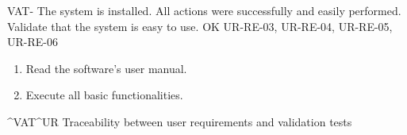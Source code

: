 \begin{testCase}{VAT-}
  {The system is installed.}  %
  {All actions were successfully and easily performed.}  %
  {Validate that the system is easy to use.}  %
  {OK}  %
  {UR-RE-03, UR-RE-04, UR-RE-05, UR-RE-06}  %
  \begin{enumerate}[leftmargin=*, topsep=0pt, noitemsep]  %
    \item Read the software's user manual.
    \item Execute all basic functionalities.
  \end{enumerate}
\end{testCase}


  {^VAT}{^UR}
  {Traceability between user requirements and validation tests}
